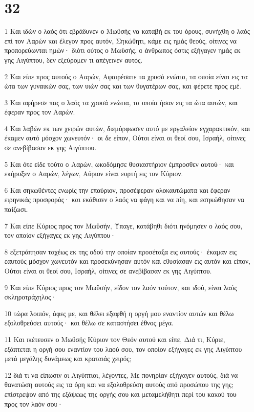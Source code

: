 \chapter{32}

\par 1 Και ιδών ο λαός ότι εβράδυνεν ο Μωϋσής να καταβή εκ του όρους, συνήχθη ο λαός επί τον Ααρών και έλεγον προς αυτόν, Σηκώθητι, κάμε εις ημάς θεούς, οίτινες να προπορεύωνται ημών· διότι ούτος ο Μωϋσής, ο άνθρωπος όστις εξήγαγεν ημάς εκ γης Αιγύπτου, δεν εξεύρομεν τι απέγεινεν αυτός.
\par 2 Και είπε προς αυτούς ο Ααρών, Αφαιρέσατε τα χρυσά ενώτια, τα οποία είναι εις τα ώτα των γυναικών σας, των υιών σας και των θυγατέρων σας, και φέρετε προς εμέ.
\par 3 Και αφήρεσε πας ο λαός τα χρυσά ενώτια, τα οποία ήσαν εις τα ώτα αυτών, και έφεραν προς τον Ααρών.
\par 4 Και λαβών εκ των χειρών αυτών, διεμόρφωσεν αυτό με εργαλείον εγχαρακτικόν, και έκαμεν αυτό μόσχον χωνευτόν· οι δε είπον, Ούτοι είναι οι θεοί σου, Ισραήλ, οίτινες σε ανεβίβασαν εκ γης Αιγύπτου.
\par 5 Και ότε είδε τούτο ο Ααρών, ωκοδόμησε θυσιαστήριον έμπροσθεν αυτού· και εκήρυξεν ο Ααρών, λέγων, Αύριον είναι εορτή εις τον Κύριον.
\par 6 Και σηκωθέντες ενωρίς την επαύριον, προσέφεραν ολοκαυτώματα και έφεραν ειρηνικάς προσφοράς· και εκάθισεν ο λαός να φάγη και να πίη, και εσηκώθησαν να παίζωσι.
\par 7 Και είπε Κύριος προς τον Μωϋσήν, Ύπαγε, κατάβηθι διότι ηνόμησεν ο λαός σου, τον οποίον εξήγαγες εκ γης Αιγύπτου·
\par 8 εξετράπησαν ταχέως εκ της οδού την οποίαν προσέταξα εις αυτούς· έκαμαν εις εαυτούς μόσχον χωνευτόν και προσεκύνησαν αυτόν και εθυσίασαν εις αυτόν και είπον, Ούτοι είναι οι θεοί σου, Ισραήλ, οίτινες σε ανεβίβασαν εκ γης Αιγύπτου.
\par 9 Και είπε Κύριος προς τον Μωϋσήν, είδον τον λαόν τούτον, και ιδού, είναι λαός σκληροτράχηλος·
\par 10 τώρα λοιπόν, άφες με, και θέλει εξαφθή η οργή μου εναντίον αυτών και θέλω εξολοθρεύσει αυτούς· και θέλω σε καταστήσει έθνος μέγα.
\par 11 Και ικέτευσεν ο Μωϋσής Κύριον τον Θεόν αυτού και είπε, Διά τι, Κύριε, εξάπτεται η οργή σου εναντίον του λαού σου, τον οποίον εξήγαγες εκ γης Αιγύπτου μετά μεγάλης δυνάμεως και κραταιάς χειρός;
\par 12 διά τι να είπωσιν οι Αιγύπτιοι, λέγοντες, Με πονηρίαν εξήγαγεν αυτούς, διά να θανατώση αυτούς εις τα όρη και να εξολοθρεύση αυτούς από προσώπου της γης; επίστρεψον από της εξάψεως της οργής σου και μεταμελήθητι περί του κακού του προς τον λαόν σου·
